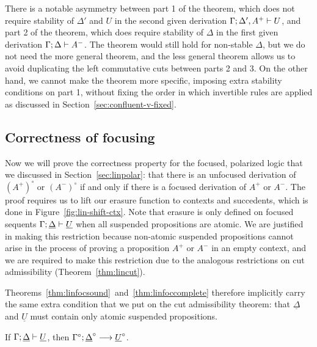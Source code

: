There is a notable asymmetry between part 1 of the theorem, which does
not require stability of $\Delta'$ and $U$ in the second given
derivation ${\Gamma};{\Delta',A^+} \vdash {U} \mathstrut$, and part 2 of the
theorem, which does require stability of $\Delta$ in the first given
derivation ${\Gamma};{\Delta} \vdash {A^-} \mathstrut$. The theorem would still
hold for non-stable $\Delta$, but we do not need the more general
theorem, and the less general theorem allows us to avoid duplicating
the left commutative cuts between parts 2 and 3. On the other hand, we
cannot make the theorem more specific, imposing extra stability
conditions on part 1, without fixing the order in which invertible
rules are applied as discussed in Section~\ref{sec:confluent-v-fixed}.

\subsection{Correctness of focusing}
\label{sec:lincorrectness}



Now we will prove the correctness property for the focused, polarized
logic that we discussed in Section~\ref{sec:linpolar}: that there is
an unfocused derivation of $(A^+)^\circ$ or $(A^-)^\circ$ if and only
if there is a focused derivation of $A^+$ or $A^-$.  The proof
requires us to lift our erasure function to contexts and succedents,
which is done in Figure~\ref{fig:lin-shift-ctx}. Note that erasure is
only defined on focused sequents
${\Gamma};{\underline{\Delta}} \vdash {\underline{U}} \mathstrut$ when all
suspended propositions are atomic. We are justified in making this
restriction because non-atomic suspended propositions cannot arise in
the process of proving a proposition $A^+$ or $A^-$ in an empty
context, and we are required to make this restriction due to the
analogous restrictions on cut admissibility
(Theorem~\ref{thm:lincut}).

Theorems~\ref{thm:linfocsound}~and~\ref{thm:linfoccomplete} therefore
implicitly carry the same extra condition that we put on the cut
admissibility theorem: that $\underline{\Delta}$ and $\underline{U}$
must contain only atomic suspended propositions.

\bigskip
\begin{theorem}\label{thm:linfocsound}
If ${\Gamma};{\underline{\Delta}} \vdash {\underline{U}} \mathstrut$, 
then ${\Gamma^\circ};{\underline{\Delta}^\circ} \longrightarrow {\underline{U}^\circ} \mathstrut$.
\end{theorem}

